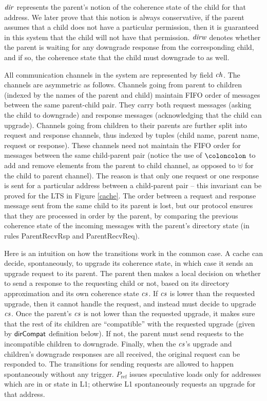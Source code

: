 $\mathit{dir}$ represents the parent's notion of the
coherence state of the child for that address. We later prove that this notion
is always conservative, \ie{} if the parent assumes that a child does not have
a particular permission, then it is guaranteed in this system that the child
will not have that permission.  $\mathit{dirw}$
denotes whether the parent is waiting for any downgrade response from the
corresponding child, and if so, the coherence state that the child must
downgrade to as well.

All communication channels in the system are represented by field $\mathit{ch}$.  The
channels are asymmetric as follows. Channels going from parent to children
(indexed by the names of the parent and child) maintain FIFO order of messages
between the same parent-child pair. They carry both request messages (asking
the child to downgrade) and response messages (acknowledging that the child can
upgrade). Channels going from children to their parents are further split into
request and response channels, thus indexed by tuples (child name, parent name,
request or response).  These channels need not maintain the FIFO order for
messages between the same child-parent pair (notice the use of $\coloncolon$ to
add and remove elements from the parent to child channel, as opposed to
$\uplus$ for the child to parent channel). The reason is that only one request
or one response is sent for a particular address between a child-parent pair --
this invariant can be proved for the LTS in  Figure \ref{cache}. The order
between a request and response message sent from the same child to its parent
is lost, but our protocol ensures that they are processed in order by the parent, by
comparing the previous coherence state of the incoming messages with the
parent's directory state (in rules ParentRecvRsp
and ParentRecvReq).

Here is an intuition on how the transitions work in the common case.  A cache
can decide, spontaneously, to upgrade its coherence state, in which case it
sends an upgrade request to its parent. The parent then makes a local decision
on whether to send a response to the requesting child or not, based on its
directory approximation and its own coherence state $\mathit{cs}$. If $\mathit{cs}$ is lower than
the requested upgrade, then it cannot handle the request, and instead must
decide to upgrade $\mathit{cs}$.  Once the parent's $\mathit{cs}$ is not lower than the requested
upgrade, it makes sure that the rest of its children are ``compatible'' with
the requested upgrade (given by $\mathsf{dirCompat}$ definition below).  If not, the
parent must send requests to the incompatible children to downgrade. Finally, when
the $\mathit{cs}$'s upgrade and children's downgrade responses are all received, the
original request can be responded to. The transitions for sending requests are
allowed to happen spontaneously without any trigger. $P_\text{ref}$ issues speculative
loads only for addresses which are in \Sh{} or \Mo{} state in L1; otherwise L1
spontaneously requests an upgrade for that address.

